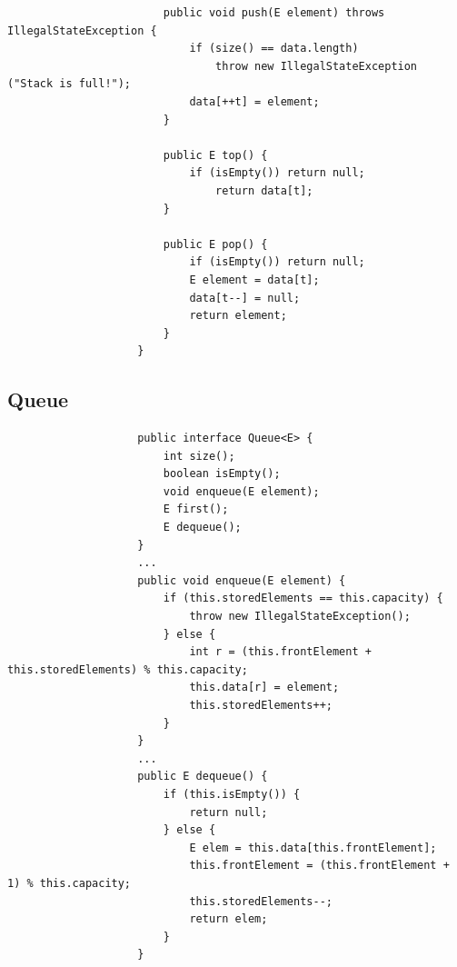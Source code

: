 \documentclass[a4paper, landscape, 8pt]{scrartcl}
\begin{document}
\begin{multicols*}{4}
\begin{lstlisting}
                        public void push(E element) throws IllegalStateException {
                            if (size() == data.length)
                                throw new IllegalStateException ("Stack is full!");
                            data[++t] = element;
                        }

                        public E top() {
                            if (isEmpty()) return null;
                                return data[t];
                        }

                        public E pop() {
                            if (isEmpty()) return null;
                            E element = data[t];
                            data[t--] = null;
                            return element;
                        }
                    }
            \end{lstlisting}

            \subsection{Queue}
                \begin{lstlisting}
                    public interface Queue<E> {
                        int size();
                        boolean isEmpty();
                        void enqueue(E element);
                        E first();
                        E dequeue();
                    }
                    ...
                    public void enqueue(E element) {
                        if (this.storedElements == this.capacity) {
                            throw new IllegalStateException();
                        } else {
                            int r = (this.frontElement + this.storedElements) % this.capacity;
                            this.data[r] = element;
                            this.storedElements++;
                        }
                    }
                    ...
                    public E dequeue() {
                        if (this.isEmpty()) {
                            return null;
                        } else {
                            E elem = this.data[this.frontElement];
                            this.frontElement = (this.frontElement + 1) % this.capacity;
                            this.storedElements--;
                            return elem;
                        }
                    }
                \end{lstlisting}



\end{multicols*}
\end{document}
